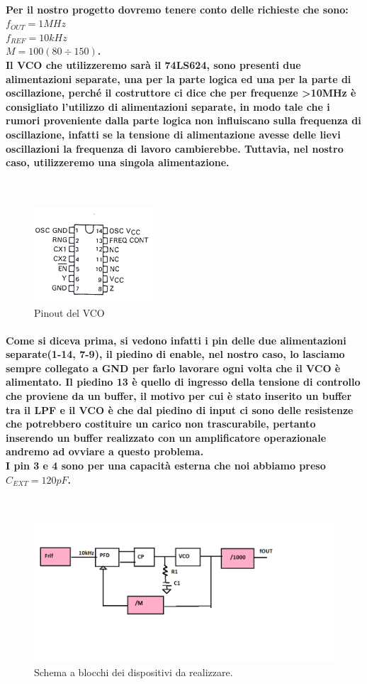 \documentclass[a4paper]{article}
\begin{document}
\paragraph{Per il nostro progetto dovremo tenere conto delle richieste che sono:\\$f_{OUT}=1 MHz$\\$f_{REF}=10 kHz$\\$M=100 (80\div150)$.\\Il VCO che utilizzeremo sarà il 74LS624, sono presenti due alimentazioni separate, una per la parte logica ed una per la parte di oscillazione, perché il costruttore ci dice che per frequenze \textgreater 10MHz è consigliato l'utilizzo di alimentazioni separate, in modo tale che i rumori proveniente dalla parte logica non influiscano sulla frequenza di oscillazione, infatti se la tensione di alimentazione avesse delle lievi oscillazioni la frequenza di lavoro cambierebbe.
Tuttavia, nel nostro caso, utilizzeremo una singola alimentazione.}
~\begin{figure}[H]%
\includegraphics[scale=1]{74LS.png} 
\centering
\caption{Pinout del VCO}
\label{fig:foo}
\end{figure}
\paragraph{Come si diceva prima, si vedono infatti i pin delle due alimentazioni separate(1-14, 7-9), il piedino di enable, nel nostro caso, lo lasciamo sempre collegato a GND per farlo lavorare ogni volta che il VCO è alimentato.
Il piedino 13 è quello di ingresso della tensione di controllo che proviene da un buffer, il motivo per cui è stato inserito un buffer tra il LPF e il VCO è che dal piedino di input ci sono delle resistenze che potrebbero costituire un carico non trascurabile, pertanto inserendo un buffer realizzato con un amplificatore operazionale andremo ad ovviare a questo problema.\\I pin 3 e 4 sono per una capacità esterna che noi abbiamo preso $C_{EXT}=120pF$.}
~\begin{figure}[H]%
\includegraphics[scale=0.4]{SCH.png} 
\centering
\caption{Schema a blocchi dei dispositivi da realizzare.}
\label{fig:foo}
\end{figure}
\end{document}
